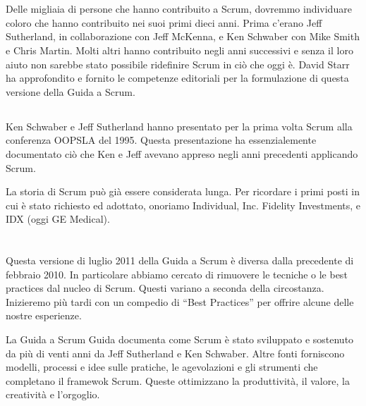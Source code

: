 \newpage
\section*{\color{Blue}{Ringraziamenti}}
\label{sec:acknowledgements}

\subsection*{\color{Blue}{Persone}}
\label{sec:people}
Delle migliaia di persone che hanno contribuito a Scrum, dovremmo individuare coloro che hanno contribuito nei suoi
primi dieci anni. Prima c'erano Jeff Sutherland, in collaborazione con Jeff McKenna, e Ken Schwaber con Mike Smith e
Chris Martin. Molti altri hanno contribuito negli anni successivi e senza il loro aiuto non sarebbe stato possibile ridefinire Scrum in ci\`o che oggi \`e. David Starr ha approfondito e fornito le competenze editoriali per la formulazione di questa versione della Guida a Scrum.

\subsection*{\color{Blue}{Storia}}
\label{sec:history}
Ken Schwaber e Jeff Sutherland hanno presentato per la prima volta Scrum alla conferenza OOPSLA del 1995. Questa presentazione ha essenzialemente documentato ci\`o che Ken e Jeff avevano appreso negli anni precedenti applicando Scrum.

La storia di Scrum pu\`o gi\`a essere considerata lunga. Per ricordare i primi posti in cui \`e stato richiesto ed adottato, onoriamo Individual, Inc. Fidelity Investments, e IDX (oggi GE Medical).

\newpage
\section*{\color{Blue}{Revisioni}}
\label{sec:revisions}

Questa versione di luglio 2011 della Guida a Scrum è diversa dalla precedente di febbraio 2010. In particolare abbiamo cercato di rimuovere le tecniche o le best practices dal nucleo di Scrum. Questi variano a seconda della circostanza. Inizieremo pi\`u tardi con un compedio di ``Best Practices'' per offrire alcune delle nostre esperienze.

La Guida a Scrum Guida documenta come Scrum \`e stato sviluppato e sostenuto da pi\`u di venti anni da Jeff Sutherland e Ken Schwaber. Altre fonti forniscono modelli, processi e idee sulle pratiche, le agevolazioni e gli strumenti che completano il framewok Scrum. Queste ottimizzano la produttività, il valore, la creatività e l'orgoglio.

